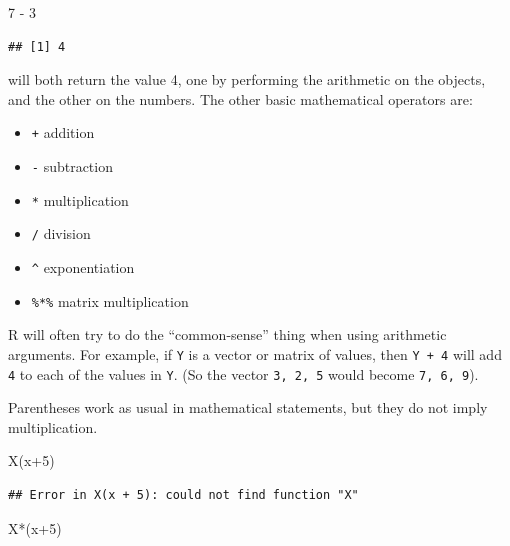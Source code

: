 \documentclass[
]{book}
\newenvironment{Shaded}{\begin{snugshade}}{\end{snugshade}}
\newcommand{\DecValTok}[1]{\textcolor[rgb]{0.00,0.00,0.81}{#1}}
\newcommand{\FunctionTok}[1]{\textcolor[rgb]{0.00,0.00,0.00}{#1}}
\newcommand{\NormalTok}[1]{#1}
\newcommand{\SpecialCharTok}[1]{\textcolor[rgb]{0.00,0.00,0.00}{#1}}
\providecommand{\tightlist}{%
  \setlength{\itemsep}{0pt}\setlength{\parskip}{0pt}}
\begin{document}
\begin{Shaded}
\begin{Highlighting}[]
\DecValTok{7} \SpecialCharTok{{-}} \DecValTok{3}
\end{Highlighting}
\end{Shaded}

\begin{verbatim}
## [1] 4
\end{verbatim}

will both return the value 4, one by performing the arithmetic on the objects, and the other on the numbers. The other basic mathematical operators are:

\begin{itemize}
\tightlist
\item
  \texttt{+} addition
\item
  \texttt{-} subtraction
\item
  \texttt{*} multiplication
\item
  \texttt{/} division
\item
  \texttt{\^{}} exponentiation
\item
  \texttt{\%*\%} matrix multiplication
\end{itemize}

R will often try to do the ``common-sense'' thing when using arithmetic arguments. For example, if \texttt{Y} is a vector or matrix of values, then \texttt{Y\ +\ 4} will add \texttt{4} to each of the values in \texttt{Y}. (So the vector \texttt{3,\ 2,\ 5} would become \texttt{7,\ 6,\ 9}).

Parentheses work as usual in mathematical statements, but they do not imply multiplication.

\begin{Shaded}
\begin{Highlighting}[]
\FunctionTok{X}\NormalTok{(x}\SpecialCharTok{+}\DecValTok{5}\NormalTok{)}
\end{Highlighting}
\end{Shaded}

\begin{verbatim}
## Error in X(x + 5): could not find function "X"
\end{verbatim}

\begin{Shaded}
\begin{Highlighting}[]
\NormalTok{X}\SpecialCharTok{*}\NormalTok{(x}\SpecialCharTok{+}\DecValTok{5}\NormalTok{)}
\end{Highlighting}
\end{Shaded}
\end{document}
